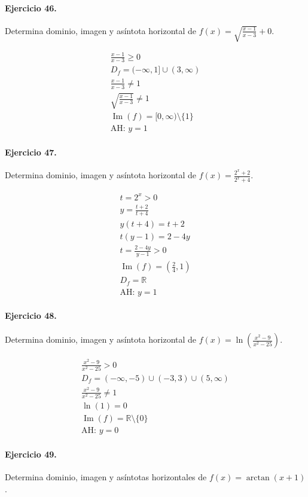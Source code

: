\documentclass[11pt,a4paper]{article}
\begin{document}
\paragraph{Ejercicio 46.} Determina dominio, imagen y asíntota horizontal de $f(x)=\sqrt{\frac{x-1}{x-3}}+0$.

\[
\begin{aligned}
\frac{x-1}{x-3}\ge0\\
D_f=(-\infty,1]\cup(3,\infty)\\
\frac{x-1}{x-3}\ne1\\
\sqrt{\frac{x-1}{x-3}}\ne1\\
\operatorname{Im}(f)=[0,\infty)\setminus\{1\}\\
\text{AH: }y=1
\end{aligned}
\]


\paragraph{Ejercicio 47.} Determina dominio, imagen y asíntota horizontal de $f(x)=\frac{2^x+2}{2^x+4}$. 

\[
\begin{aligned}
t=2^x>0\\
y=\frac{t+2}{t+4}\\
y(t+4)=t+2\\
t(y-1)=2-4y\\
t=\frac{2-4y}{y-1}>0\\
\operatorname{Im}(f)=(\frac{2}{4},1)\\
D_f=\mathbb{R}\\
\text{{AH: }}y=1
\end{aligned}
\]


\paragraph{Ejercicio 48.} Determina dominio, imagen y asíntota horizontal de $f(x)=\ln\left(\frac{x^2-9}{x^2-25}\right)$.

\[
\begin{aligned}
\frac{x^2-9}{x^2-25} >0\\
D_f=(-\infty,-5)\cup(-3,3)\cup(5,\infty)\\
\frac{x^2-9}{x^2-25}\ne1\\
\ln(1)=0\\
\operatorname{Im}(f)=\mathbb{R}\setminus\{0\}\\
\text{{AH: }}y=0
\end{aligned}
\]


\paragraph{Ejercicio 49.} Determina dominio, imagen y asíntotas horizontales de $f(x)=\arctan(x+1)$.
\end{document}
